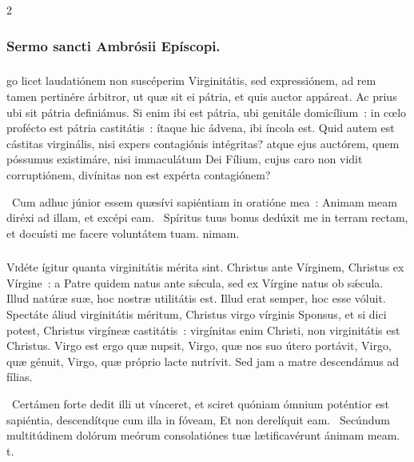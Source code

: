 \documentclass[9pt,twoside]{extarticle}
\begin{document}
\begin{multicols}{2}
{\subsubsection*{\center Sermo sancti Ambrósii Epíscopi.}
\subsubsection*{\center {}}
go licet laudatiónem non suscéperim Virginitátis, sed expressiónem, ad rem tamen pertinére árbitror, ut quæ sit ei pátria, et quis auctor appáreat. Ac prius ubi sit pátria definiámus. Si enim ibi est pátria, ubi genitále domicílium~: in cœlo profécto est pátria castitátis~: ítaque hic ádvena, ibi íncola est. Quid autem est cástitas virginális, nisi expers contagiónis intégritas? atque ejus auctórem, quem póssumus existimáre, nisi immaculátum Dei Fílium, cujus caro non vidit corruptiónem, divínitas non est expérta contagiónem?

\begin{tightlist}{}
\item {}~Cum adhuc júnior essem quæsívi sapiéntiam in oratióne mea~: \textred{*} Animam meam diréxi ad illam, et excépi eam. ~Spíritus tuus bonus dedúxit me in terram rectam, et docuísti me facere voluntátem tuam. nimam.
\end{tightlist}

\subsubsection*{\center {}}
\lettrine{V}idéte ígitur quanta virginitátis mérita sint. Christus ante Vírginem, Christus ex Vírgine~: a Patre quidem natus ante sǽcula, sed ex Vírgine natus ob sǽcula. Illud natúræ suæ, hoc nostræ utilitátis est. Illud erat semper, hoc esse vóluit. Spectáte áliud virginitátis méritum, Christus virgo vírginis Sponsus, et si dici potest, Christus virgíneæ castitátis~: virgínitas enim Christi, non virginitátis est Christus. Virgo est ergo quæ nupsit, Virgo, quæ nos suo útero portávit, Virgo, quæ génuit, Virgo, quæ próprio lacte nutrívit. Sed jam a matre descendámus ad fílias.

\begin{tightlist}{}
\item {}~Certámen forte dedit illi ut vínceret, et sciret quóniam ómnium poténtior est sapiéntia, descendítque cum illa in fóveam, \textred{*} Et non derelíquit eam. ~Secúndum multitúdinem dolórum meórum consolatiónes tuæ lætificavérunt ánimam meam. t.
\end{tightlist}

}
\end{multicols}
\end{document}
